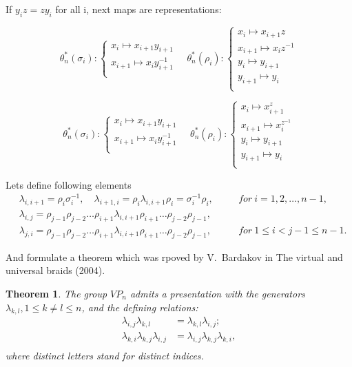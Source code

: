 \documentclass{article}
\newtheorem{theorem}{Theorem}
\begin{document}
If $y_i z = z y_i$ for all i, next maps are representations:

\begin{equation}\label{defGV}
\theta_n^*(\sigma_i):
\begin{cases}
x_i \mapsto x_{i+1}y_{i+1}\\
x_{i+1} \mapsto x_iy_{i+1}^{-1}\\
\end{cases}\quad
\theta_n^*(\rho_i):
\begin{cases}
x_i \mapsto x_{i+1}z\\
x_{i+1} \mapsto x_iz^{-1}\\
y_i \mapsto y_{i+1}\\
y_{i+1} \mapsto y_i\\
\end{cases}
\end{equation}

\begin{equation}\label{defGV}
\theta_n^*(\sigma_i):
\begin{cases}
x_i \mapsto x_{i+1}y_{i+1}\\
x_{i+1} \mapsto x_iy_{i+1}^{-1}\\
\end{cases}\quad
\theta_n^*(\rho_i):
\begin{cases}
x_i \mapsto x_{i+1}^z\\
x_{i+1} \mapsto x_i^{z^{-1}}\\
y_i \mapsto y_{i+1}\\
y_{i+1} \mapsto y_i\\
\end{cases}
\end{equation}

Lets define following elements
\begin{align*}
&\lambda_{i, i+1} = \rho_i\sigma_i^{-1}, \quad \lambda_{i+1,i}=\rho_i\lambda_{i,i+1}\rho_i = \sigma_i^{-1}\rho_i, \quad &&for ~ i = 1,2,\dots,n-1,\\
&\lambda_{i,j} = \rho_{j-1}\rho_{j-2}\dots\rho_{i+1}\lambda_{i,i+1}\rho_{i+1}\dots\rho_{j-2}\rho_{j-1},\\
&\lambda_{j,i} = \rho_{j-1}\rho_{j-2}\dots\rho_{i+1}\lambda_{i,i+1}\rho_{i+1}\dots\rho_{j-2}\rho_{j-1}, \quad &&for ~ 1 \le i < j-1 \le n-1.
\end{align*}

And formulate a theorem which was rpoved by V.~Bardakov in 
The virtual and universal braids (2004).

\begin{theorem}
	The group $VP_n$ admits a presentation with the generators $\lambda_{k,l}, 1 \le k \not= l \le n$, and the defining relations:
	\begin{align*}
	\lambda_{i,j}\lambda_{k,l} &= \lambda_{k,l}\lambda_{i,j}; \\
	\lambda_{k,i}\lambda_{k,j}\lambda_{i,j} &= \lambda_{i,j}\lambda_{k,j}\lambda_{k,i}, \\
	\end{align*}
	where distinct letters stand for distinct indices.
\end{theorem}
\end{document}
